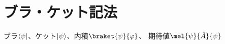 \documentclass[../sotsu.tex]{subfiles}
\begin{document}
\section{ブラ・ケット記法}

ブラ$\langle\psi\rvert$、ケット$\lvert\psi\rangle$、内積$\braket{\psi}{\varphi}$、
期待値$\mel{\psi}{\hat{A}}{\psi}$
\end{document}
